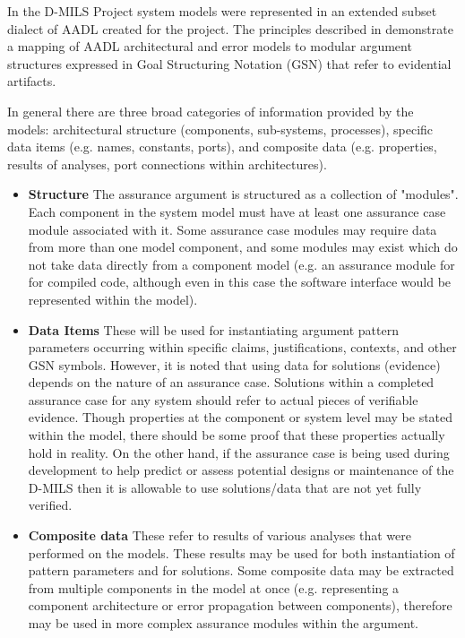 \documentclass[12pt,twoside,a4paper]{article}
\begin{document}
In the D-MILS Project system models were represented in an extended subset dialect of AADL created for the project.
The principles described in
\cite{D-MILS-D2.3}
demonstrate a mapping of AADL architectural and error models to modular argument structures expressed in Goal Structuring Notation (GSN)
\cite{kelly2004goal,GSN_standard} that refer to evidential artifacts.

In general there are three broad categories of information provided by the models: architectural structure (components, sub-systems, processes), specific data items (e.g. names, constants, ports), and composite data (e.g. properties, results of analyses, port connections within architectures). 

\begin{itemize}
\item{\bf Structure} The assurance argument is structured as a collection of "modules". Each component in the system model must have at least one assurance case module associated with it. Some assurance case modules may require data from more than one model component, and some modules may exist which do not take data directly from a component model (e.g. an assurance module for for compiled code, although even in this case the software interface would be represented within the model). 
\item{\bf Data Items} These will be used for instantiating argument pattern parameters occurring within specific claims, justifications, contexts, and other GSN symbols.
However, it is noted that using data for solutions (evidence) depends on the nature of an assurance case. Solutions within a completed assurance case for any system should refer to actual pieces of verifiable evidence.
Though properties at the component or system level may be stated within the model, there should be some proof that these properties actually hold in reality. 
On the other hand, if the assurance case is being used during development to help predict or assess potential designs or maintenance of the D-MILS then it is allowable to use solutions/data that are not yet fully verified.  
\item{\bf Composite data} These refer to results of various analyses that were performed on the models.
These results may be used for both instantiation of pattern parameters and for solutions.
Some composite data may be extracted from multiple components in the model at once (e.g. representing a component architecture or error propagation between components), therefore may be used in more complex assurance modules within the argument.
\end{itemize}
\end{document}

